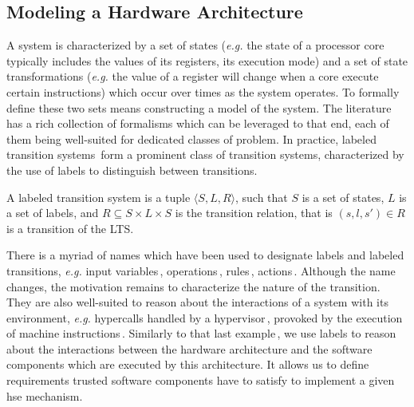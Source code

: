 \subsection{Modeling a Hardware Architecture}
\label{subsec:sota:ltsdef}

A system is characterized by a set of states (\emph{e.g.} the state of a
processor core typically includes the values of its registers, its execution
mode) and a set of state transformations (\emph{e.g.}  the value of a register
will change when a core execute certain instructions) which occur over times as
the system operates.
%
To formally define these two sets means constructing a model of the system.
%
The literature has a rich collection of formalisms which can be leveraged to
that end, each of them being well-suited for dedicated classes of problem.
%
In practice, labeled transition systems\,\cite{loiseaux1995lts} form a prominent
class of transition systems, characterized by the use of labels to distinguish
between transitions.

\begin{definition}
  A labeled transition system is a tuple \( \langle S, L, R \rangle \), such
  that \( S \) is a set of states, \( L \) is a set of labels, and
  \( R \subseteq S \times L \times S \) is the transition relation, that is
  \( (s, l, s') \in R \) is a transition of the LTS.
\end{definition}

There is a myriad of names which have been used to designate labels and labeled
transitions, \emph{e.g.} input variables\,\cite{cimatti2002nusmv},
operations\,\cite{jackson2012alloy}, rules\,\cite{murphi},
actions\,\cite{barthe2011virtcert1}.
%
Although the name changes, the motivation remains to characterize the nature of
the transition.
%
They are also well-suited to reason about the interactions of a system with its
environment, \emph{e.g.} hypercalls handled by a
hypervisor\,\cite{barthe2011virtcert1}, \IOs provoked by the execution of
machine instructions\,\cite{lie2003xom}.
%
Similarly to that last example\,\cite{lie2003xom}, we use labels to reason about
the interactions between the hardware architecture and the software components
which are executed by this architecture.
%
It allows us to define requirements trusted software components have to satisfy
to implement a given \ac{hse} mechanism.


